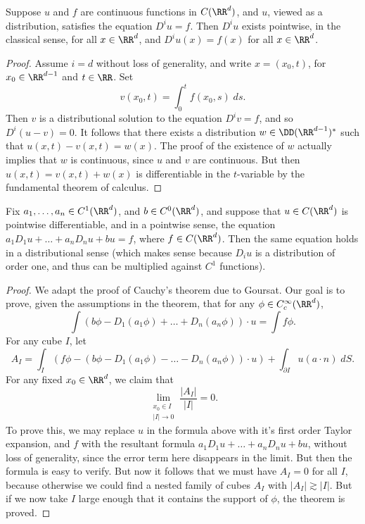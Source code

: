 \begin{lemma}
    Suppose $u$ and $f$ are continuous functions in $C(\RR^d)$, and $u$, viewed as a distribution, satisfies the equation $D^i u = f$. Then $D^i u$ exists pointwise, in the classical sense, for all $x \in \RR^d$, and $D^i u (x) = f(x)$ for all $x \in \RR^d$.
\end{lemma}
\begin{proof}
    Assume $i = d$ without loss of generality, and write $x = (x_0,t)$, for $x_0 \in \RR^{d-1}$ and $t \in \RR$. Set
    \[ v(x_0,t) = \int_0^t f(x_0,s)\; ds. \]
    Then $v$ is a distributional solution to the equation $D^i v = f$, and so $D^i(u - v) = 0$. It follows that there exists a distribution $w \in \DD(\RR^{d-1})^*$ such that $u(x,t) - v(x,t) = w(x)$. The proof of the existence of $w$ actually implies that $w$ is continuous, since $u$ and $v$ are continuous. But then $u(x,t) = v(x,t) + w(x)$ is differentiable in the $t$-variable by the fundamental theorem of calculus.
\end{proof}

\begin{theorem}
    Fix $a_1,\dots,a_n \in C^1(\RR^d)$, and $b \in C^0(\RR^d)$, and suppose that $u \in C(\RR^d)$ is pointwise differentiable, and in a pointwise sense, the equation $a_1 D_1 u + \dots + a_n D_n u + b u = f$, where $f \in C(\RR^d)$. Then the same equation holds in a distributional sense (which makes sense because $D_i u$ is a distribution of order one, and thus can be multiplied against $C^1$ functions).
\end{theorem}
\begin{proof}
    We adapt the proof of Cauchy's theorem due to Goursat. Our goal is to prove, given the assumptions in the theorem, that for any $\phi \in C_c^\infty(\RR^d)$,
    \[ \int (b \phi - D_1(a_1 \phi) + \dots + D_n(a_n \phi)) \cdot u = \int f \phi. \]
    For any cube $I$, let
    \[ A_I = \int_I (f \phi - (b \phi - D_1(a_1 \phi) - \dots - D_n(a_n \phi)) \cdot u) + \int_{\partial I} u (a \cdot n)\; dS. \]
    For any fixed $x_0 \in \RR^d$, we claim that
    \[ \lim_{\substack{x_0 \in I\\|I| \to 0}} \frac{|A_I|}{|I|} = 0. \]
    To prove this, we may replace $u$ in the formula above with it's first order Taylor expansion, and $f$ with the resultant formula $a_1 D_1 u + \dots + a_n D_n u + bu$, without loss of generality, since the error term here disappears in the limit. But then the formula is easy to verify. But now it follows that we must have $A_I = 0$ for all $I$, because otherwise we could find a nested family of cubes $A_I$ with $|A_I| \gtrsim |I|$. But if we now take $I$ large enough that it contains the support of $\phi$, the theorem is proved.
\end{proof}

